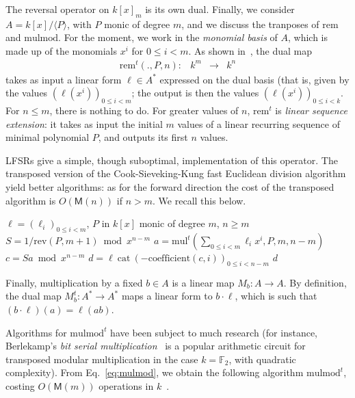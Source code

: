 \documentclass{sig-alternate}
\def\M {\ensuremath{\mathsf{M}}}
\def\F {\ensuremath{\mathbb{F}}}
\def\mul {\ensuremath{\mathrm{mul}}}
\def\rem {\ensuremath{\mathrm{rem}}}
\def\cat {\ensuremath{\mathrm{cat}}}
\def\coeff {\ensuremath{\mathrm{coefficient}}}
\def\mulmod {\ensuremath{\mathrm{mulmod}}}
\def\rev {\ensuremath{\mathrm{rev}}}
\newcommand{\ang}[1]{\langle#1\rangle}
\begin{document}
The reversal operator on $k[x]_m$ is its own dual. Finally, we
consider $A=k[x]/\ang{P}$, with $P$ monic of degree $m$, and we
discuss the tranposes of $\rem$ and $\mulmod$.  For the moment, we
work in the \emph{monomial basis} of $A$, which is made up of the
monomials $x^i$ for $0\le i<m$.  As shown
in~\cite{bostan+lecerf+schost:tellegen}, the dual map
$$
\begin{array}{cccc}
\rem^t(.,P,n): &k^m& \to &k^n
\end{array}$$ 
takes as input a linear form $\ell\in A^\ast$ expressed on the dual
basis (that is, given by the values $(\ell(x^i))_{0 \le i <m}$; the
output is then the values $(\ell(x^i))_{0 \le i < k}$. For $n \le m$,
there is nothing to do. For greater values of $n$, $\rem^t$ is
\emph{linear sequence extension}: it takes as input the initial $m$
values of a linear recurring sequence of minimal polynomial $P$, and
outputs its first $n$ values.

LFSRs give a simple, though suboptimal, implementation of this
operator. The transposed version of the Cook-Sieveking-Kung fast
Euclidean division algorithm yield better algorithms: as for the
forward direction the cost of the transposed algorithm is $O(\M(n))$
if $n>m$. We recall this below.

\begin{algorithm}[H]
  \caption{$\rem^t(\ell,P,n)$}
  \begin{algorithmic}[1]
    \REQUIRE $\ell=(\ell_i)_{0 \le i < m}$, $P$ in $k[x]$ monic of degree $m$, $n \ge m$
    \STATE $S = 1/\rev(P, m+1) \bmod x^{n-m}$
    \STATE $a = \mul^t( \sum_{0 \le i < m} \ell_{i}x^i, P, m, n-m)$
    \STATE $c = S a \bmod x^{n-m}$
    \STATE $d = \ell ~\cat~ (-\coeff(c,i))_{0 \le i < n-m}$
    \RETURN $d$
  \end{algorithmic}
\end{algorithm}

Finally, multiplication by a fixed $b\in A$ is a linear map $M_b:A\to
A$. By definition, the dual map $M_b^t: A^* \to A^*$ maps a linear
form to $b \cdot \ell$, which is such that $(b \cdot \ell)(a)
=\ell(ab)$.  

Algorithms for $\mulmod^t$ have been subject to much
research (for instance, Berlekamp's \emph{bit serial
  multiplication}~\cite{Berlekamp82} is a popular arithmetic circuit
for transposed modular multiplication in the case $k=\F_2$, with
quadratic complexity). From Eq.~\eqref{eq:mulmod}, we obtain the
following algorithm $\mulmod^t$, costing $O(\M(m))$ operations in
$k$~\cite{shoup99,bostan+lecerf+schost:tellegen}.
\end{document}
